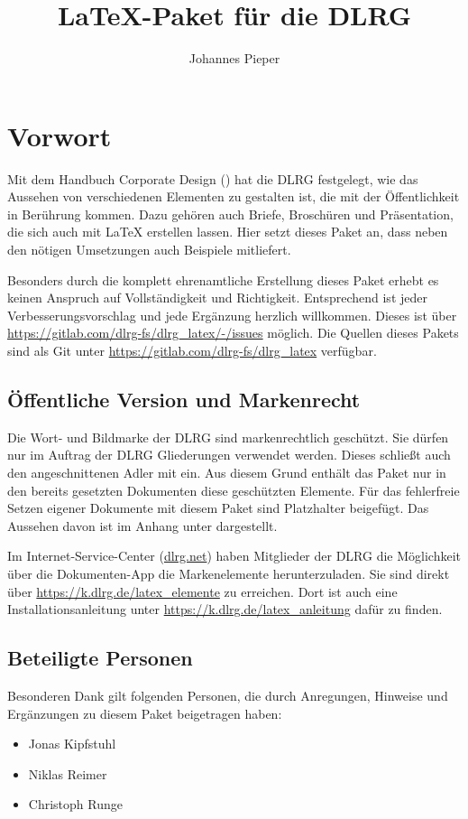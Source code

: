 \documentclass[
    a4paper,
    12pt,
    parskip=half,
    bibliography=totoc,
]{scrartcl}
\title{\LaTeX{}-Paket für die DLRG}
\author{Johannes Pieper}
\begin{document}
\maketitle

\tableofcontents

\clearpage

\section{Vorwort}
    Mit dem Handbuch Corporate Design (\cite{DLRG_CD2024}) hat die DLRG festgelegt, wie das Aussehen von verschiedenen Elementen zu gestalten ist, die mit der Öffentlichkeit in Berührung kommen. Dazu gehören auch Briefe, Broschüren und Präsentation, die sich auch mit \LaTeX{} erstellen lassen. Hier setzt dieses Paket an, dass neben den nötigen Umsetzungen auch Beispiele mitliefert.

    Besonders durch die komplett ehrenamtliche Erstellung dieses Paket erhebt es keinen Anspruch auf Vollständigkeit und Richtigkeit. Entsprechend ist jeder Verbesserungsvorschlag und jede Ergänzung herzlich willkommen. Dieses ist über \url{https://gitlab.com/dlrg-fs/dlrg_latex/-/issues} möglich. Die Quellen dieses Pakets sind als Git unter \url{https://gitlab.com/dlrg-fs/dlrg_latex} verfügbar.

    \subsection{Öffentliche Version und Markenrecht}\label{sec:markenrecht}
    Die Wort- und Bildmarke der DLRG sind markenrechtlich geschützt. Sie dürfen nur im Auftrag der DLRG Gliederungen verwendet werden. Dieses schließt auch den angeschnittenen Adler mit ein. Aus diesem Grund enthält das Paket nur in den bereits gesetzten Dokumenten diese geschützten Elemente. Für das fehlerfreie Setzen eigener Dokumente mit diesem Paket sind Platzhalter beigefügt. Das Aussehen davon ist im Anhang unter  dargestellt.

    Im Internet-Service-Center (\url{dlrg.net}) haben Mitglieder der DLRG die Möglichkeit über die Dokumenten-App die Markenelemente herunterzuladen. Sie sind direkt über \url{https://k.dlrg.de/latex_elemente} zu erreichen. Dort ist auch eine Installationsanleitung unter \url{https://k.dlrg.de/latex_anleitung} dafür zu finden.

    \subsection{Beteiligte Personen}
    Besonderen Dank gilt folgenden Personen, die durch Anregungen, Hinweise und Ergänzungen zu diesem Paket beigetragen haben:
    \begin{itemize}
        \item Jonas Kipfstuhl
        \item Niklas Reimer
        \item Christoph Runge
    \end{itemize}
\end{document}
